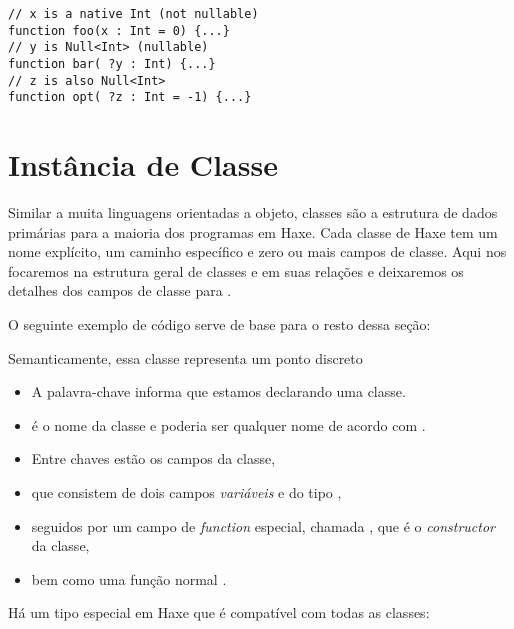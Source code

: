 \begin{lstlisting}
// x is a native Int (not nullable)
function foo(x : Int = 0) {...}
// y is Null<Int> (nullable)
function bar( ?y : Int) {...}
// z is also Null<Int>
function opt( ?z : Int = -1) {...}
\end{lstlisting}


\section{Instância de Classe}
\label{types-class-instance}

Similar a muita linguagens orientadas a objeto, classes são a estrutura de dados primárias para a maioria dos programas em Haxe. Cada classe de Haxe tem um nome explícito, um caminho específico e zero ou mais campos de classe. Aqui nos focaremos na estrutura geral de classes e em suas relações e deixaremos os detalhes dos campos de classe para .

O seguinte exemplo de código serve de base para o resto dessa seção:


Semanticamente, essa classe representa um ponto discreto 

\begin{itemize}
	\item A palavra-chave  informa que estamos declarando uma classe.
	\item {} é o nome da classe e poderia ser qualquer nome de acordo com .
	\item Entre chaves \expr{$\left\{\right\}$} estão os campos da classe,
	\item que consistem de dois campos \emph{variáveis}  e  do tipo ,
	\item seguidos por um campo de \emph{function} especial, chamada , que é o \emph{constructor} da classe,
	\item bem como uma função normal .
\end{itemize}
Há um tipo especial em Haxe que é compatível com todas as classes:

